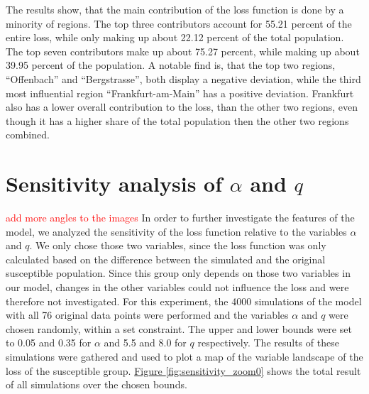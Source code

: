 The results show, that the main contribution of the loss function is done by a minority of regions. The top three contributors
account for 55.21 percent of the entire loss, while only making up about 22.12 percent of the total population. The top seven
contributors make up about 75.27 percent, while making up about 39.95 percent of the population. A notable find is, that the
top two regions, ``Offenbach'' and ``Bergstrasse'', both display a negative deviation, while the third most influential region
``Frankfurt-am-Main'' has a positive deviation. Frankfurt also has a lower overall contribution to the loss, than the other
two regions, even though it has a higher share of the total population then the other two regions combined.


\section{Sensitivity analysis of $\alpha$ and $q$}
\textcolor{red}{add more angles to the images}
In order to further investigate the features of the model, we analyzed the sensitivity of the loss function relative to
the variables $\alpha$ and $q$. We only chose those two variables, since the loss function was only calculated based
on the difference between the simulated and the original susceptible population. Since this group only depends on those
two variables in our model, changes in the other variables could not influence the loss and were therefore not investigated.
For this experiment, the 4000 simulations of the model with all 76 original data points were performed and the variables
$\alpha$ and $q$ were chosen randomly, within a set constraint. The upper and lower bounds were set to 0.05 and 0.35 for 
$\alpha$ and 5.5 and 8.0 for $q$ respectively. The results of these simulations were gathered and used to plot a map
of the variable landscape of the loss of the susceptible group.
\hyperref[fig:sensitivity_zoom0]{Figure \ref*{fig:sensitivity_zoom0}} shows the total result of all simulations over the
chosen bounds.

